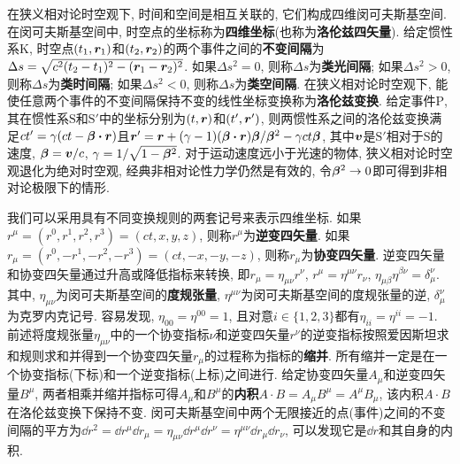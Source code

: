 在狭义相对论时空观下, 时间和空间是相互关联的, 它们构成四维闵可夫斯基空间. 在闵可夫斯基空间中, 时空点的坐标称为\textbf{四维坐标}(也称为\textbf{洛伦兹四矢量}). 给定惯性系$ \mathrm{K} $, 时空点$ (t_1,\vb*{r}_1) $和$ (t_2,\vb*{r}_2) $的两个事件之间的\textbf{不变间隔}为$ \Delta s = \sqrt{c^2(t_2-t_1)^2-(\vb*{r}_1-\vb*{r}_2)^2} $. 如果$ \Delta s^2 = 0 $, 则称$ \Delta s $为\textbf{类光间隔}; 如果$ \Delta s^2 > 0 $, 则称$ \Delta s $为\textbf{类时间隔}; 如果$ \Delta s^2 < 0 $, 则称$ \Delta s $为\textbf{类空间隔}. 在狭义相对论时空观下, 能使任意两个事件的不变间隔保持不变的线性坐标变换称为\textbf{洛伦兹变换}. 给定事件$ \mathrm{P} $, 其在惯性系$ \mathrm{S} $和$ \mathrm{S}' $中的坐标分别为$ (t,\vb*{r}) $和$ (t',\vb*{r}') $, 则两惯性系之间的洛伦兹变换满足$ ct' = \gamma(ct - \vb*{\beta} \vdot \vb*{r}) $且$ \vb*{r}' = \vb*{r} + (\gamma-1) (\vb*{\beta} \vdot \vb*{r}) \vb*{\beta} / \vb*{\beta}^2 - \gamma ct \vb*{\beta} $, 其中$ \vb*{v} $是$ \mathrm{S}' $相对于$ \mathrm{S} $的速度, $ \vb*{\beta}=\vb*{v}/c $, $ \gamma=1/\sqrt{1-\vb*{\beta}^2} $. 对于运动速度远小于光速的物体, 狭义相对论时空观退化为绝对时空观, 经典非相对论性力学仍然是有效的, 令$ \vb*{\beta}^2 \to 0 $即可得到非相对论极限下的情形.

我们可以采用具有不同变换规则的两套记号来表示四维坐标. 如果$ r^{\mu}=(r^0,r^1,r^2,r^3)=(ct,x,y,z) $, 则称$ r^{\mu} $为\textbf{逆变四矢量}. 如果$ r_{\mu}=(r^0,-r^1,-r^2,-r^3)=(ct,-x,-y,-z) $, 则称$ r_{\mu} $为\textbf{协变四矢量}. 逆变四矢量和协变四矢量通过升高或降低指标来转换, 即$ r_{\mu}=\eta_{\mu\nu} r^{\nu} $, $ r^{\mu}=\eta^{\mu\nu} r_{\nu} $, $ \eta_{\mu\beta}\eta^{\beta\nu}=\delta_{\mu}^{\nu} $. 其中, $ \eta_{\mu\nu} $为闵可夫斯基空间的\textbf{度规张量}, $ \eta^{\mu\nu} $为闵可夫斯基空间的度规张量的逆, $ \delta_{\mu}^{\nu} $为克罗内克记号. 容易发现, $ \eta_{00}=\eta^{00}=1 $, 且对意$ i \in \{1,2,3\} $都有$ \eta_{ii}=\eta^{ii}=-1 $. 前述将度规张量$ \eta_{\mu\nu} $中的一个协变指标$ \nu $和逆变四矢量$ r^{\nu} $的逆变指标按照爱因斯坦求和规则求和并得到一个协变四矢量$ r_{\mu} $的过程称为指标的\textbf{缩并}. 所有缩并一定是在一个协变指标(下标)和一个逆变指标(上标)之间进行. 给定协变四矢量$ A_{\mu} $和逆变四矢量$ B^{\mu} $, 两者相乘并缩并指标可得$ A_{\mu} $和$ B^{\mu} $的\textbf{内积}$ A \cdot B = A_{\mu}B^{\mu} = A^{\mu}B_{\mu} $, 该内积$ A \cdot B $在洛伦兹变换下保持不变. 闵可夫斯基空间中两个无限接近的点(事件)之间的不变间隔的平方为$ \dd r^2 = \dd{r^{\mu}} \dd{r_{\mu}} = \eta_{\mu\nu} \dd{r^{\mu}} \dd{r^{\nu}} = \eta^{\mu\nu} \dd{r_{\mu}} \dd{r_{\nu}} $, 可以发现它是$ \dd{r} $和其自身的内积.


